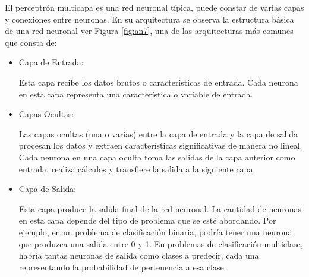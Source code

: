 El perceptrón multicapa es una red neuronal típica, puede constar de varias capas y conexiones entre neuronas. En su arquitectura se observa la estructura básica de una red neuronal ver Figura \ref{fig:an7}, una de las arquitecturas más comunes que consta de: 
\begin{itemize}

	\item Capa de Entrada: 
	
	Esta capa recibe los datos brutos o características de entrada. Cada neurona en esta capa representa una característica o variable de entrada.

	\item Capas Ocultas: 
	
	Las capas ocultas (una o varias) entre la capa de entrada y la capa de salida procesan los datos y extraen características significativas de manera no lineal. Cada neurona en una capa oculta toma las salidas de la capa anterior como entrada, realiza cálculos y transfiere la salida a la siguiente capa.

	\item Capa de Salida:
	
	Esta capa produce la salida final de la red neuronal. La cantidad de neuronas en esta capa depende del tipo de problema que se esté abordando. Por ejemplo, en un problema de clasificación binaria, podría tener una neurona que produzca una salida entre 0 y 1. En problemas de clasificación multiclase, habría tantas neuronas de salida como clases a predecir, cada una representando la probabilidad de pertenencia a esa clase.
\end{itemize}